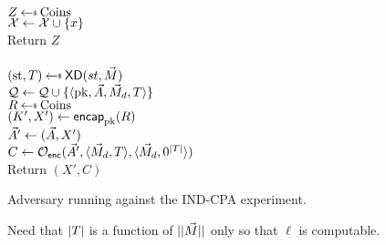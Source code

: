\begin{figure}[tbhp]
\begin{center}
{\\
  $Z \getsr \mathrm{Coins}$\\
  $\mathcal{X} \gets \mathcal{X} \cup \{x\}$\\
  Return $Z$\\

\\
$(\st, \umd) \getsr \mdalg(st,\vmsg)$\\
$\mathcal{Q} \gets \mathcal{Q} \cup \{\langle \mathrm{pk},\vec{A},\vec{M}_d,T\rangle\}$\\
$R \getsr \mathrm{Coins}$\\
$(K',X') \gets \mathsf{encap}_{\mathrm{pk}}^{}(R)$\\
$\vec{A}' \gets (\vec{A}, X')$\\
$C \gets \mathcal{O}_{\mathsf{enc}}(\vec{A}',\langle \vec{M}_d,T\rangle, \langle \vec{M}_d,0^{|T|}\rangle)$\\
Return $(X',C)$\\
}
\caption{Adversary running against the IND-CPA experiment.}
\label{fig:CPA-KDadv}
\end{center}
\end{figure}

\begin{figure}
\begin{center}
\caption{Need that $|T|$ is a function of $||\vec{M}||$ only so that $\ell$ is computable.}
\end{center}
\end{figure}

